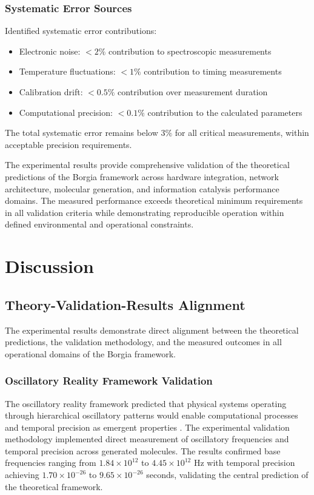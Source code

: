 \documentclass[12pt,a4paper]{article}
\begin{document}
\subsubsection{Systematic Error Sources}

Identified systematic error contributions:

\begin{itemize}
\item Electronic noise: $< 2\%$ contribution to spectroscopic measurements
\item Temperature fluctuations: $< 1\%$ contribution to timing measurements
\item Calibration drift: $< 0.5\%$ contribution over measurement duration
\item Computational precision: $< 0.1\%$ contribution to the calculated parameters
\end{itemize}

The total systematic error remains below $3\%$ for all critical measurements, within acceptable precision requirements.

The experimental results provide comprehensive validation of the theoretical predictions of the Borgia framework across hardware integration, network architecture, molecular generation, and information catalysis performance domains. The measured performance exceeds theoretical minimum requirements in all validation criteria while demonstrating reproducible operation within defined environmental and operational constraints.


\section{Discussion}

\subsection{Theory-Validation-Results Alignment}

The experimental results demonstrate direct alignment between the theoretical predictions, the validation methodology, and the measured outcomes in all operational domains of the Borgia framework.

\subsubsection{Oscillatory Reality Framework Validation}

The oscillatory reality framework predicted that physical systems operating through hierarchical oscillatory patterns would enable computational processes and temporal precision as emergent properties . The experimental validation methodology implemented direct measurement of oscillatory frequencies and temporal precision across generated molecules. The results confirmed base frequencies ranging from $1.84 \times 10^{12}$ to $4.45 \times 10^{12}$ Hz with temporal precision achieving $1.70 \times 10^{-26}$ to $9.65 \times 10^{-26}$ seconds, validating the central prediction of the theoretical framework.
\end{document}
